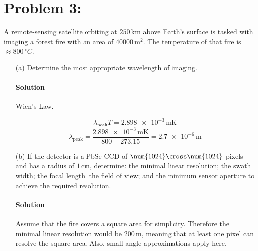 \documentclass{article}
\begin{document}
{\begin{enumerate}
		
		
	\end{enumerate}
	
	\clearpage
	
	\section*{Problem 3: }
	A remote-sensing satellite orbiting at $\num{250} \, \unit{\kilo\meter}$ above Earth’s surface is tasked with imaging a forest fire with an area of $\unit{40000} \, \unit{\meter\squared}$. The temperature of that fire is $\approx \num{800} \, \unit{^\circ C}$. \\
	\begin{enumerate}
		\item[(a)] Determine the most appropriate wavelength of imaging. \\
		\paragraph{Solution} Wien's Law.
		
		\[
			\lambda_\mathrm{peak} T = \num{2.898e-3} \, \unit{\meter\kelvin}
		\]
		\[
			\lambda_\mathrm{peak} = \frac{\num{2.898e-3} \, \unit{\meter\kelvin}}{800 + 273.15} = \num{2.7e-6} \, \unit{\meter}
		\]
		
		
		
		\item[(b)] If the detector is a PbSe CCD of $\num{1024} \cross \num{1024}$ pixels and has a radius of $\num{1} \, \unit{\centi\meter}$, determine: the minimal linear resolution; the swath width; the focal length; the field of view; and the minimum sensor aperture to achieve the required resolution. \\
		\paragraph{Solution} Assume that the fire covers a square area for simplicity. Therefore the minimal linear resolution would be $\num{200} \, \unit{\meter}$, meaning that at least one pixel can resolve the square area. Also, small angle approximations apply here.
		

\end{enumerate}}
\end{document}
